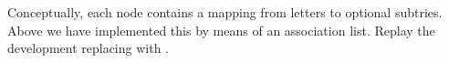 \begin{isabellebody}
\begin{isamarkuptext}
\begin{exercise}
  Conceptually, each node contains a mapping from letters to optional
  subtries. Above we have implemented this by means of an association
  list. Replay the development replacing 
  with .
\end{exercise}%
\end{isamarkuptext}%
\isamarkuptrue%
%
\isadelimproof
%
\endisadelimproof
%
\isatagproof
%
\endisatagproof
{\isafoldproof}%
%
\isadelimproof
%
\endisadelimproof
%
\isadelimproof
%
\endisadelimproof
%
\isatagproof
%
\endisatagproof
{\isafoldproof}%
%
\isadelimproof
%
\endisadelimproof
%
\isadelimproof
%
\endisadelimproof
%
\isatagproof
%
\endisatagproof
{\isafoldproof}%
%
\isadelimproof
%
\endisadelimproof
%
\isadelimproof
%
\endisadelimproof
%
\isatagproof
%
\endisatagproof
{\isafoldproof}%
%
\isadelimproof
%
\endisadelimproof
%
\isadelimproof
%
\endisadelimproof
%
\isatagproof
%
\endisatagproof
{\isafoldproof}%
%
\isadelimproof
%
\endisadelimproof
%
\isadelimtheory
%
\endisadelimtheory
%
\isatagtheory
%
\endisatagtheory
{\isafoldtheory}%
%
\isadelimtheory
%
\endisadelimtheory
\end{isabellebody}%
